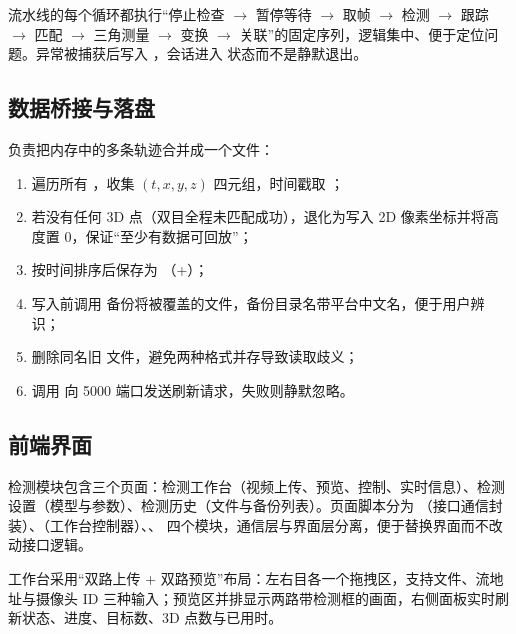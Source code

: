 流水线的每个循环都执行“停止检查 $\rightarrow$ 暂停等待 $\rightarrow$ 取帧 $\rightarrow$ 检测 $\rightarrow$ 跟踪 $\rightarrow$ 匹配 $\rightarrow$ 三角测量 $\rightarrow$ 变换 $\rightarrow$ 关联”的固定序列，逻辑集中、便于定位问题。异常被捕获后写入 ，会话进入  状态而不是静默退出。

\subsection{数据桥接与落盘}

 负责把内存中的多条轨迹合并成一个文件：

\begin{enumerate}
  \item 遍历所有 ，收集 $(t,x,y,z)$ 四元组，时间戳取 ；
  \item 若没有任何 3D 点（双目全程未匹配成功），退化为写入 2D 像素坐标并将高度置 0，保证“至少有数据可回放”；
  \item 按时间排序后保存为 （+）；
  \item 写入前调用  备份将被覆盖的文件，备份目录名带平台中文名，便于用户辨识；
  \item 删除同名旧  文件，避免两种格式并存导致读取歧义；
  \item 调用  向 5000 端口发送刷新请求，失败则静默忽略。
\end{enumerate}

\subsection{前端界面}

检测模块包含三个页面：检测工作台（视频上传、预览、控制、实时信息）、检测设置（模型与参数）、检测历史（文件与备份列表）。页面脚本分为 （接口通信封装）、（工作台控制器）、、 四个模块，通信层与界面层分离，便于替换界面而不改动接口逻辑。

工作台采用“双路上传 + 双路预览”布局：左右目各一个拖拽区，支持文件、流地址与摄像头 ID 三种输入；预览区并排显示两路带检测框的画面，右侧面板实时刷新状态、进度、目标数、3D 点数与已用时。
